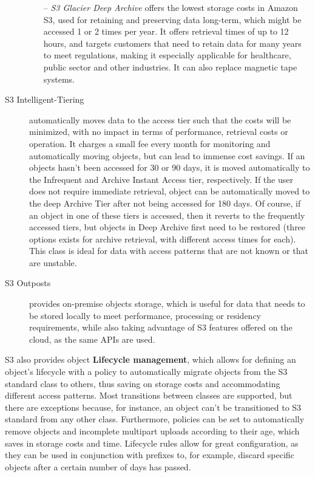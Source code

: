 \begin{description}
\begin{itemize}
        \item[--] \textit{S3 Glacier Deep Archive} offers the lowest storage costs in Amazon S3, used for retaining and preserving data long-term, which might be accessed 1 or 2 times per year. It offers retrieval times of up to 12 hours, and targets customers that need to retain data for many years to meet regulations, making it especially applicable for healthcare, public sector and other industries. It can also replace magnetic tape systems.
    \end{itemize}

    \item[S3 Intelligent-Tiering] automatically moves data to the access tier such that the costs will be minimized, with no impact in terms of performance, retrieval costs or operation. It charges a small fee every month for monitoring and automatically moving objects, but can lead to immense cost savings. If an objects hasn't been accessed for 30 or 90 days, it is moved automatically to the Infrequent and Archive Instant Access tier, respectively. If the user does not require immediate retrieval, object can be automatically moved to the deep Archive Tier after not being accessed for 180 days. Of course, if an object in one of these tiers is accessed, then it reverts to the frequently accessed tiers, but objects in Deep Archive first need to be restored (three options exists for archive retrieval, with different access times for each). ~\cite{archiverestore} This class is ideal for data with access patterns that are not known or that are unstable.

    \item[S3 Outposts] provides on-premise objects storage, which is useful for data that needs to be stored locally to meet performance, processing or residency requirements, while also taking advantage of S3 features offered on the cloud, as the same APIs are used.
\end{description}

S3 also provides object\textbf{ Lifecycle management}, which allows for defining an object's lifecycle with a policy to automatically migrate objects from the S3 standard class to others, thus saving on storage costs and accommodating different access patterns. Most transitions between classes are supported, but there are exceptions because, for instance, an object can't be transitioned to S3 standard from any other class. Furthermore,  policies can be set to automatically remove objects and incomplete multipart uploads according to their age, which saves in storage costs and time. Lifecycle rules allow for great configuration, as they can be used in conjunction with prefixes to, for example, discard specific objects after a certain number of days has passed. ~\cite{s3lifecycle}

